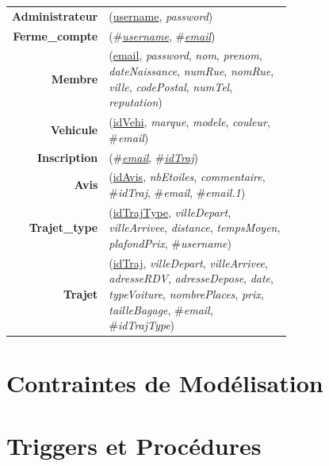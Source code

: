 \documentclass[a4paper,12pt]{article}
\newenvironment{mld}
  {\par\begin{minipage}{\linewidth}\begin{tabular}{rp{0.7\linewidth}}}
  {\end{tabular}\end{minipage}\par}
\newcommand{\attr}[1]{\emph{#1}}
\newcommand{\prim}[1]{\uline{#1}}
\newcommand{\foreign}[1]{\#\textsl{#1}}
\theoremstyle{remark}
\begin{document}
\begin{mld}
  \textbf{Administrateur} & (\prim{username}, \attr{password})\\
  \textbf{Ferme\_compte} & (\foreign{\prim{username}}, \foreign{\prim{email}})\\
  \textbf{Membre} & (\prim{email}, \attr{password}, \attr{nom}, \attr{prenom}, \attr{dateNaissance}, \attr{numRue}, \attr{nomRue}, \attr{ville}, \attr{codePostal}, \attr{numTel}, \attr{reputation})\\
  \textbf{Vehicule} & (\prim{idVehi}, \attr{marque}, \attr{modele}, \attr{couleur}, \foreign{email})\\
  \textbf{Inscription} & (\foreign{\prim{email}}, \foreign{\prim{idTraj}})\\
  \textbf{Avis} & (\prim{idAvis}, \attr{nbEtoiles}, \attr{commentaire}, \foreign{idTraj}, \foreign{email}, \foreign{email.1})\\
  \textbf{Trajet\_type} & (\prim{idTrajType}, \attr{villeDepart}, \attr{villeArrivee}, \attr{distance}, \attr{tempsMoyen}, \attr{plafondPrix}, \foreign{username})\\
  \textbf{Trajet} & (\prim{idTraj}, \attr{villeDepart}, \attr{villeArrivee}, \attr{adresseRDV}, \attr{adresseDepose}, \attr{date}, \attr{typeVoiture}, \attr{nombrePlaces}, \attr{prix}, \attr{tailleBagage}, \foreign{email}, \foreign{idTrajType})\\
\end{mld}

\section*{Contraintes de Modélisation}
\label{sec:contraintes}

\section*{Triggers et Procédures}
\label{sec:triggers}
\end{document}
